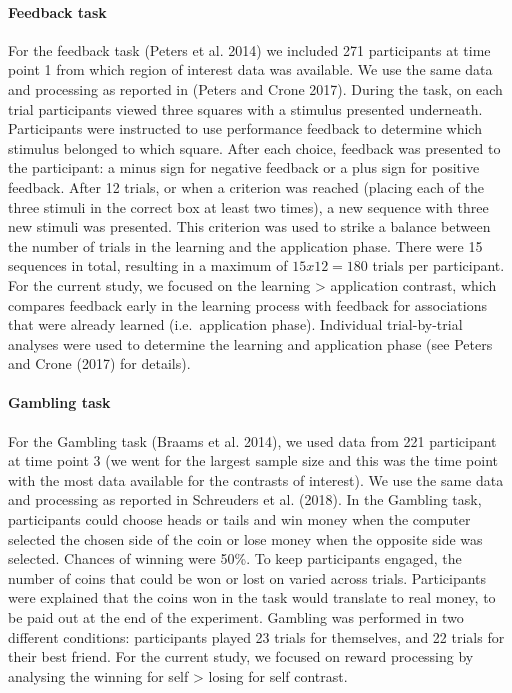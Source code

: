 \documentclass[
  letterpaper,
  DIV=11,
  numbers=noendperiod]{scrartcl}
\let\oldparagraph\paragraph
\renewcommand{\paragraph}[1]{\oldparagraph{#1}\mbox{}}
\begin{document}
\paragraph{Feedback task}\label{feedback-task}

For the feedback task (Peters et al. 2014) we included 271 participants
at time point 1 from which region of interest data was available. We use
the same data and processing as reported in (Peters and Crone 2017).
During the task, on each trial participants viewed three squares with a
stimulus presented underneath. Participants were instructed to use
performance feedback to determine which stimulus belonged to which
square. After each choice, feedback was presented to the participant: a
minus sign for negative feedback or a plus sign for positive feedback.
After 12 trials, or when a criterion was reached (placing each of the
three stimuli in the correct box at least two times), a new sequence
with three new stimuli was presented. This criterion was used to strike
a balance between the number of trials in the learning and the
application phase. There were 15 sequences in total, resulting in a
maximum of \(15 x 12 = 180\) trials per participant. For the current
study, we focused on the learning \textgreater{} application contrast,
which compares feedback early in the learning process with feedback for
associations that were already learned (i.e.~application phase).
Individual trial-by-trial analyses were used to determine the learning
and application phase (see Peters and Crone (2017) for details).

\paragraph{Gambling task}\label{gambling-task}

For the Gambling task (Braams et al. 2014), we used data from 221
participant at time point 3 (we went for the largest sample size and
this was the time point with the most data available for the contrasts
of interest). We use the same data and processing as reported in
Schreuders et al. (2018). In the Gambling task, participants could
choose heads or tails and win money when the computer selected the
chosen side of the coin or lose money when the opposite side was
selected. Chances of winning were 50\%. To keep participants engaged,
the number of coins that could be won or lost on varied across trials.
Participants were explained that the coins won in the task would
translate to real money, to be paid out at the end of the experiment.
Gambling was performed in two different conditions: participants played
23 trials for themselves, and 22 trials for their best friend. For the
current study, we focused on reward processing by analysing the winning
for self \textgreater{} losing for self contrast.
\end{document}
